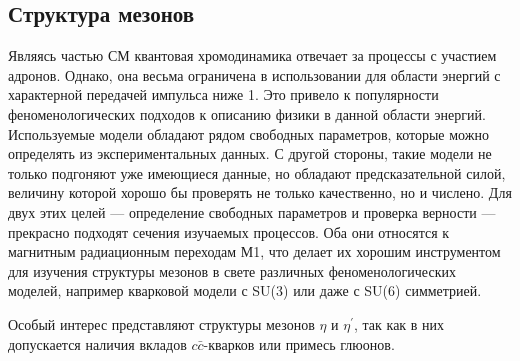\subsection{Структура мезонов}
\label{meson-structures}

Являясь частью СМ квантовая хромодинамика отвечает за процессы с участием адронов. Однако, она весьма ограничена в использовании для области энергий с характерной передачей импульса ниже \SI{1}{\GeVr}.
Это привело к популярности феноменологических подходов к описанию физики в данной области энергий.
Используемые модели обладают рядом свободных параметров,
которые можно определять из экспериментальных данных. С другой стороны,
такие модели не только подгоняют уже имеющиеся данные, но обладают
предсказательной силой, величину которой хорошо бы проверять не только качественно, но и числено. Для двух
этих целей --- определение свободных параметров и проверка верности ---
прекрасно подходят сечения изучаемых процессов.
Оба они относятся к магнитным радиационным переходам М1,
что делает их хорошим инструментом для изучения структуры мезонов в
свете различных феноменологических моделей, например кварковой модели с
SU(3) или даже с SU(6) симметрией.


Особый интерес представляют структуры мезонов $\eta$ и $\eta^\prime$, так как в них допускается наличия вкладов $c\bar{c}$-кварков или примесь глюонов. 

